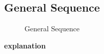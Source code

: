 \subsection{General Sequence}
\begin{figure}[!htb]
    \centering
    \caption{General Sequence}
    \label{fig:seq-general}
\end{figure}

\textbf{explanation}

